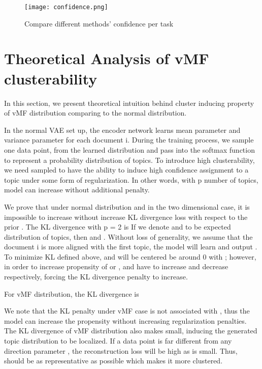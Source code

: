 \documentclass[11pt]{article}
\begin{document}
\begin{figure*}
\centering
\texttt{[image: confidence.png]}
\caption{Compare different methods'  confidence per task}
\label{confidence}
\end{figure*}






\section{Theoretical Analysis of vMF clusterability}
\label{theory}
In this section, we present theoretical intuition behind cluster inducing property of vMF distribution comparing to the normal distribution.

In the normal VAE set up, the encoder network learns mean parameter  and variance parameter  for each document i. During the training process, we sample one data point,  from the learned distribution and pass into the softmax function to represent a probability distribution of topics. To introduce high clusterability, we need sampled  to have the ability to induce high confidence assignment to a topic under some form of regularization. In other words, with p number of topics, model can increase  without additional penalty. 

We prove that under normal distribution and in the two dimensional case, it is impossible to increase  without increase KL divergence loss with respect to the prior . The KL divergence with p = 2 is 
If we denote  and  to be expected distribution of topics, then  and . Without loss of generality, we assume that the document i is more aligned with the first topic, the model will learn and output . To minimize KL defined above,  and  will be centered be around 0 with ; however, in order to increase propensity of  or ,  and  have to increase and decrease respectively, forcing the KL divergence penalty to increase.

For vMF distribution, the KL divergence is
 
We note that the KL penalty under vMF case is not associated with , thus the model can increase the propensity without increasing regularization penalties. The KL divergence of vMF
distribution also makes  small, inducing the generated topic
distribution to be localized. If a data point is far different
from any direction parameter , the reconstruction loss will
be high as  is small. Thus,  should be as representative as
possible which makes it more clustered.
\end{document}
